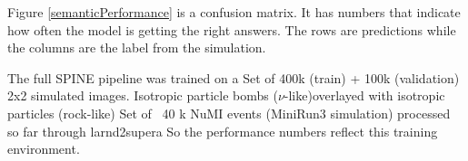 Figure \ref{semanticPerformance}  is a confusion matrix. It has numbers that indicate how often the model is getting the right answers. The rows are predictions while the columns are the label from the simulation.

The full SPINE pipeline was trained on a Set of 400k (train) + 100k (validation) 2x2 simulated images.
Isotropic particle bombs ($\nu$-like)overlayed with isotropic particles (rock-like)
Set of ~40 k NuMI events (MiniRun3 simulation) processed so far through larnd2supera
So the performance numbers reflect this training environment.






